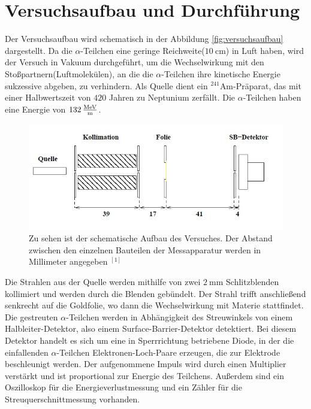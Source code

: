 \documentclass{article}
\begin{document}
\section{Versuchsaufbau und Durchführung}
\label{sec:Durchführung}
Der Versuchsaufbau wird schematisch in der Abbildung \ref{fig:versuchsaufbau} dargestellt. Da die $\alpha$-Teilchen eine geringe Reichweite($\SI{10}{\centi\meter}$) in Luft haben, wird der Versuch in Vakuum durchgeführt, um die Wechselwirkung mit den Stoßpartnern(Luftmolekülen), an die die $\alpha$-Teilchen ihre kinetische Energie sukzessive abgeben, zu verhindern. Als Quelle dient ein $^{241}$Am-Präparat, das mit einer Halbwertszeit von $420$ Jahren zu Neptunium zerfällt. Die $\alpha$-Teilchen haben eine Energie von $\SI{132}{\frac{\mega\electronvolt}{\meter}}$.
\begin{figure}[h!]
	\centering
	\includegraphics[width=0.9\linewidth]{Versuchsaufbau.jpg}
	\caption{Zu sehen ist der schematische Aufbau des Versuches. Der Abstand zwischen den einzelnen Bauteilen der Messapparatur werden in Millimeter angegeben $^{[1]}$}

\end{figure}
Die Strahlen aus der Quelle werden mithilfe von zwei $\SI{2}{\milli\meter}$ Schlitzblenden kollimiert und werden durch die Blenden gebündelt. Der Strahl trifft anschließend senkrecht auf die Goldfolie, wo dann die Wechselwirkung mit Materie stattfindet. Die gestreuten $\alpha$-Teilchen werden in Abhängigkeit des Streuwinkels von einem Halbleiter-Detektor, also einem Surface-Barrier-Detektor detektiert. Bei diesem Detektor handelt es sich um eine in Sperrrichtung betriebene Diode, in der die einfallenden $\alpha$-Teilchen Elektronen-Loch-Paare erzeugen, die zur Elektrode beschleunigt werden. Der aufgenommene Impuls wird durch einen Multiplier verstärkt und ist proportional zur Energie des Teilchens. Außerdem sind ein Oszilloskop für die Energieverlustmessung und ein Zähler für die Streuquerschnittmessung vorhanden.
\end{document}
